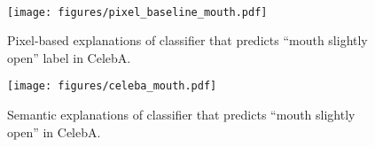 \documentclass{article}
\begin{document}
\newpage
~

\begin{figure}[t]
\centering
\texttt{[image: figures/pixel\_baseline\_mouth.pdf]}
\caption{Pixel-based explanations of classifier that predicts ``mouth slightly open'' label in CelebA.}
\label{fig:pixel_mouth}
\vspace{1cm}
\end{figure}


\begin{figure}[t]
\centering
\texttt{[image: figures/celeba\_mouth.pdf]}
\caption{Semantic explanations of classifier that predicts ``mouth slightly open'' in CelebA.}
\label{fig:shapley_mouth}
\end{figure}


\end{document}
